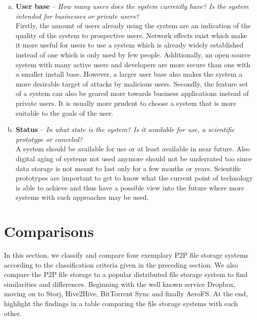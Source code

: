 \begin{enumerate}[(a)]
\item \textbf{User base} -- \textit{How many users does the system currently have? Is the system intended for businesses or private users?}\\
Firstly, the amount of users already using the system are an indication of the quality of the system to prospective users. Network effects exist which make it more useful for users to use a system which is already widely established instead of one which is only used by few people. Additionally, an open source system with many active users and developers are more secure than one with a smaller install base. However, a larger user base also makes the system a more desirable target of attacks by malicious users. Secondly, the feature set of a system can also be geared more towards business applications instead of private users. It is usually more prudent to choose a system that is more suitable to the goals of the user.

\item \textbf{Status} -- \textit{In what state is the system? Is it available for use, a scientific prototype or canceled?}\\
A system should be available for use or at least available in near future. Also digital aging of systems not used anymore should not be underrated too since data storage is not meant to last only for a few months or years. Scientific prototypes are important to get to know what the current point of technology is able to achieve and thus have a possible view into the future where more systems with such approaches may be used.
\end{enumerate}

\section{Comparisons}
\label{comparisons}
In this section, we classify and compare four exemplary P2P file storage systems according to the classification criteria given in the preceding section. We also compare the P2P file storage to a popular distributed file storage system to find similarities and differences. Beginning with the well known service Dropbox, moving on to Storj, Hive2Hive, BitTorrent Sync and finally AeroFS. At the end, highlight the findings in a table comparing the file storage systems with each other.

